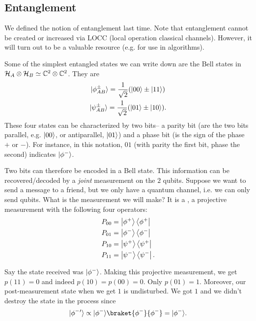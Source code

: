 \subsection*{Entanglement} 
We defined the notion of entanglement last time. Note that entanglement cannot be created or increased via LOCC (local operation classical channels). However, it will turn out to be a valuable resource (e.g. for use in algorithms).

Some of the simplest entangled states we can write down are the Bell states in $\mathcal H_A \otimes \mathcal H_B \simeq \mathbb{C}^2 \otimes \mathbb{C}^2$. They are
\begin{gather}
    \lvert\phi_{AB}^\pm\rangle = \frac{1}{\sqrt{2}}(\lvert00\rangle \pm \lvert11\rangle)\\
    \lvert\psi_{AB}^\pm\rangle = \frac{1}{\sqrt{2}} (\lvert01\rangle \pm \lvert10\rangle).
\end{gather}
These four states can be characterized by two bits-- a parity bit (are the two bits parallel, e.g. $\lvert00\rangle$, or antiparallel, $\lvert01\rangle$) and a phase bit (is the sign of the phase $+$ or $-$). For instance, in this notation, $01$ (with parity the first bit, phase the second) indicates $\lvert\phi^-\rangle$.

Two bits can therefore be encoded in a Bell state. This information can be recovered/decoded by a \emph{joint} measurement on the $2$ qubits. Suppose we want to send a message to a friend, but we only have a quantum channel, i.e. we can only send qubits. What is the measurement we will make? It is a , a projective measurement with the following four operators:
\begin{align}
    P_{00}&=\left| \phi^+ \right>\left< \phi^+ \right|\\
    P_{01}&=\left| \phi^- \right>\left< \phi^- \right|\\
    P_{10}&=\left| \psi^+ \right>\left< \psi^+ \right|\\
    P_{11}&=\left| \psi^- \right>\left< \psi^- \right|.
\end{align}

Say the state received was $\lvert\phi^-\rangle$. Making this projective measurement, we get $p(11)=0$ and indeed $p(10)=p(00)=0$. Only $p(01)=1$. Moreover, our post-measurement state when we get $1$ is undisturbed. We got $1$ and we didn't destroy the state in the process since
\begin{equation}
    \ket{\phi^-{}'}\propto \ket{\phi^-}\braket{\phi^-}{\phi^-} = \ket{\phi^-}.
\end{equation}


